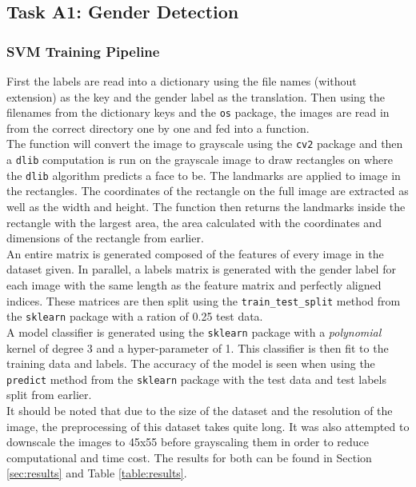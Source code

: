 \documentclass{article}
\begin{document}
    \subsection{Task A1: Gender Detection}
	\subsubsection{SVM Training Pipeline}
	 First the labels are read into a dictionary using the file names (without extension) as the key and the gender label as the translation. Then using the filenames from the dictionary keys and the \verb|os| package, the images are read in from the correct directory one by one and fed into a function.\\
	 
	 The function will convert the image to grayscale using the \verb|cv2| package and then a \verb|dlib| computation is run on the grayscale image to draw rectangles on where the \verb|dlib| algorithm predicts a face to be. The landmarks are applied to image in the rectangles. The coordinates of the rectangle on the full image are extracted as well as the width and height. The function then returns the landmarks inside the rectangle with the largest area, the area calculated with the coordinates and dimensions of the rectangle from earlier.\\
	 
	 An entire matrix is generated composed of the features of every image in the dataset given. In parallel, a labels matrix is generated with the gender label for each image with the same length as the feature matrix and perfectly aligned indices. These matrices are then split using the \verb|train_test_split| method from the \verb|sklearn| package with a ration of 0.25 test data.\\
	 
	 A model classifier is generated using the \verb|sklearn| package with a \textit{polynomial} kernel of degree 3 and a hyper-parameter of 1. This classifier is then fit to the training data and labels. The accuracy of the model is seen when using the \verb|predict| method from the \verb|sklearn| package with the test data and test labels split from earlier.\\
	 
	 It should be noted that due to the size of the dataset and the resolution of the image, the preprocessing of this dataset takes quite long. It was also attempted to downscale the images to 45x55 before grayscaling them in order to reduce computational and time cost. The results for both can be found in Section \ref{sec:results} and Table \ref{table:results}.
\end{document}
